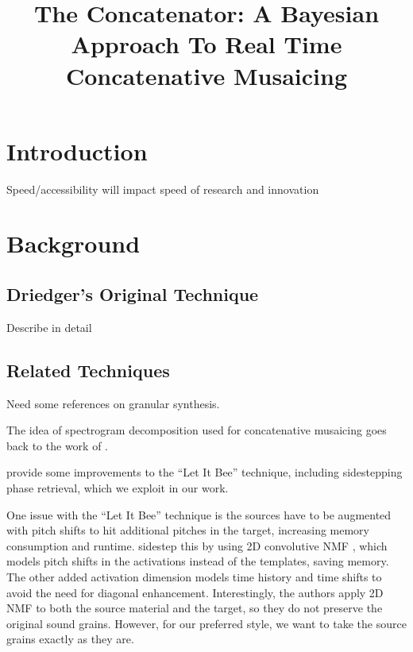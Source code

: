 \documentclass{article}
\title{The Concatenator: A Bayesian Approach To Real Time Concatenative Musaicing}
\begin{document}
%
\maketitle
%

\begin{abstract}

\end{abstract}

\section{Introduction}

Speed/accessibility will impact speed of research and innovation

\section{Background}


\subsection{Driedger's Original Technique}

Describe in detail

\subsection{Related Techniques}

Need some references on granular synthesis.

The idea of spectrogram decomposition used for concatenative musaicing goes back to the work of \cite{burred2013cross}.

\cite{buch2017nichtnegativematrixfaktorisierungnutzendesklangsynthesensystem} provide some improvements to the ``Let It Bee'' technique, including sidestepping phase retrieval, which we exploit in our work.

One issue with the ``Let It Bee'' technique is the sources have to be augmented with pitch shifts to hit additional pitches in the target, increasing memory consumption and runtime.  \cite{foroughmand2017multi, aarabi2018music} sidestep this by using 2D convolutive NMF \cite{schmidt2006nonnegative}, which models pitch shifts in the activations instead of the templates, saving memory.  The other added activation dimension models time history and time shifts to avoid the need for diagonal enhancement.  Interestingly, the authors apply 2D NMF to both the source material and the target, so they do not preserve the original sound grains.  However, for our preferred style, we want to take the source grains exactly as they are.
\end{document}
